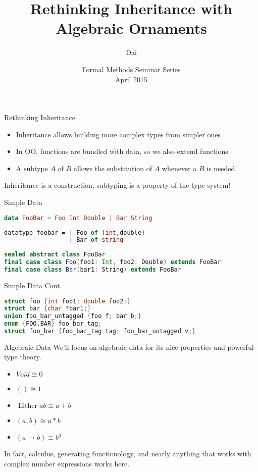\documentclass{beamer}
\title{Rethinking Inheritance with Algebraic Ornaments}
\author{Dai}\\
\institute[MIT] %
{ MIT}
\date{Formal Methods Seminar Series\\April 2015}
\begin{document}
\begin{frame}
  \titlepage
\end{frame}

\begin{frame}{Rethinking Inheritance}
\begin{itemize}
\item Inheritance allows building more complex types from simpler ones
\item In OO, functions are bundled with data, so we also extend functions
\pause
\item A subtype $A$ of $B$ allows the substitution of $A$ whenever a $B$ is needed.

\end{itemize}
\pause
Inheritance is a construction, subtyping is a property of the type system!
\end{frame}


\begin{frame}[fragile]{Simple Data}
\begin{lstlisting}[language=Haskell]
data FooBar = Foo Int Double | Bar String
\end{lstlisting}
\hrulefill
\begin{lstlisting}[language=ML]
datatype foobar = | Foo of (int,double) 
                  | Bar of string
\end{lstlisting}
\hrulefill
\begin{lstlisting}[language=Scala]
sealed abstract class FooBar
final case class Foo(foo1: Int, foo2: Double) extends FooBar
final case class Bar(bar1: String) extends FooBar
\end{lstlisting}
\end{frame}

\begin{frame}[fragile]{Simple Data Cont.}
\begin{lstlisting}[language=C]
struct foo {int foo1; double foo2;}
struct bar {char *bar1;}
union foo_bar_untagged {foo f; bar b;}
enum {FOO,BAR} foo_bar_tag;
struct foo_bar {foo_bar_tag tag; foo_bar_untagged v;}
\end{lstlisting}
\end{frame}
\lstset{style=mystyle}

\begin{frame}{Algebraic Data}
We'll focus on algebraic data for its nice properties and powerful type theory.
\pause
\begin{itemize}
\item $Void \cong 0$
\item $() \cong 1$
\item $\operatorname{Either} a b \cong a + b$
\item $(a,b) \cong a * b$
\item $(a \to b) \cong b^a$
\end{itemize}
\hrulefill
\pause

In fact, calculus, generating functionology, and nearly anything that works with complex number expressions works here.
\end{frame}
\end{document}

